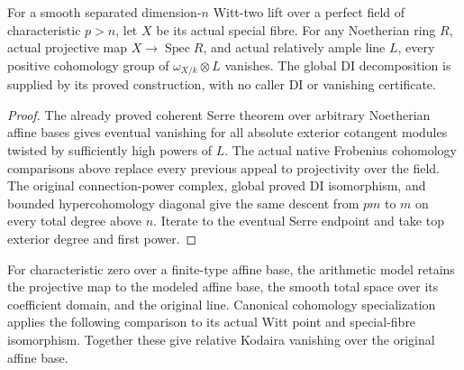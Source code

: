 \begin{theorem}
\label{thm:kn-relative-ample-kodaira-witt-special-fibre}
\leanok
For a smooth separated dimension-$n$ Witt-two lift over a perfect field of
characteristic $p>n$, let $X$ be its actual special fibre. For any Noetherian
ring $R$, actual projective map $X\to\operatorname{Spec}R$, and actual relatively
ample line $L$, every positive cohomology group of $\omega_{X/k}\otimes L$
vanishes. The global DI decomposition is supplied by its proved construction,
with no caller DI or vanishing certificate.
\end{theorem}
\begin{proof}
The already proved coherent Serre theorem over arbitrary Noetherian affine
bases gives eventual vanishing for all absolute exterior cotangent modules
twisted by sufficiently high powers of $L$. The actual native Frobenius
cohomology comparisons above replace every previous appeal to projectivity
over the field. The original connection-power complex, global proved DI
isomorphism, and bounded hypercohomology diagonal give the same descent from
$p m$ to $m$ on every total degree above $n$. Iterate to the eventual Serre
endpoint and take top exterior degree and first power.
\end{proof}

For characteristic zero over a finite-type affine base, the arithmetic model
retains the projective map to the modeled affine base, the smooth total space
over its coefficient domain,
and the original line. Canonical cohomology specialization applies the
following comparison to its actual Witt point and special-fibre isomorphism.
Together these give relative Kodaira vanishing over the original affine base.

